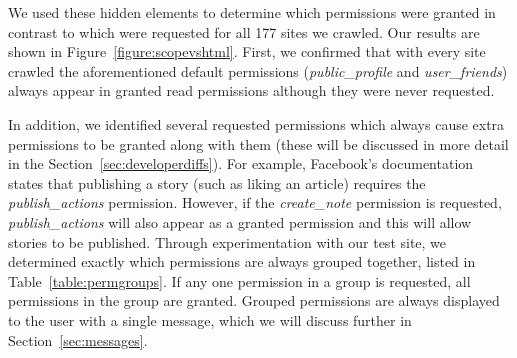 \documentclass{sig-alternate}
\begin{document}
We used these hidden elements to determine which permissions were granted in contrast to which were requested for all 177 sites we crawled.
Our results are shown in Figure~\ref{figure:scopevshtml}.
First, we confirmed that with every site crawled the aforementioned default permissions (\emph{public\_profile} and \emph{user\_friends}) always appear in granted read permissions although they were never requested.

In addition, we identified several requested permissions which always cause extra permissions to be granted along with them (these will be discussed in more detail in the Section~\ref{sec:developerdiffs}).
For example, Facebook's documentation states that publishing a story (such as liking an article) requires the \emph{publish\_actions} permission.
However, if the \emph{create\_note} permission is requested, \emph{publish\_actions} will also appear as a granted permission and this will allow stories to be published.
Through experimentation with our test site, we determined exactly which permissions are always grouped together, listed in Table~\ref{table:permgroups}.
If any one permission in a group is requested, all permissions in the group are granted.
Grouped permissions are always displayed to the user with a single message, which we will discuss further in Section~\ref{sec:messages}.

\label{sec:developerdiffs}
\end{document}

